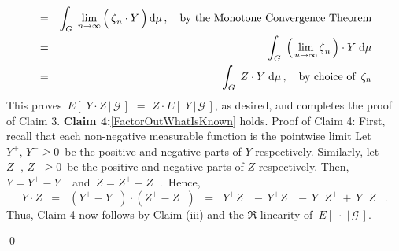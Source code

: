 \begin{enumerate}
\begin{eqnarray*}
	&=&
		\int_{G}\;
			\underset{n\rightarrow\infty}{\lim}\left(\,\overset{{\color{white}.}}{\zeta}_{n} \cdot Y\,\right)
			\d\mu
			\,,\quad\textnormal{by the Monotone Convergence Theorem}
	\\
	&=&
		\int_{G}\;
			\left(\,\underset{n\rightarrow\infty}{\lim}\,\overset{{\color{white}.}}{\zeta}_{n}\,\right) \cdot Y
			\;\d\mu
	\\
	&=&
		\int_{G}\; Z \cdot Y \;\d\mu
			\,,\quad\textnormal{by choice of \,$\zeta_{n}$}
	\end{eqnarray*}
	This proves \,$E\!\left[\;Y \cdot Z\,\vert\,\mathcal{G}\,\right]$ $=$ $Z \cdot E\!\left[\;Y\,\vert\,\mathcal{G}\,\right]$,
	as desired, and completes the proof of Claim 3.
	\vskip 0.4cm
	\textbf{Claim 4:}\;\;\eqref{FactorOutWhatIsKnown} holds.
	\vskip 0.0cm
	Proof of Claim 4: First, recall that each non-negative measurable function is the pointwise limit
	Let \,$Y^{+},\,Y^{-} \geq 0$\, be the positive and negative parts of $Y$ respectively.
	Similarly, let \,$Z^{+},\,Z^{-} \geq 0$\, be the positive and negative parts of $Z$ respectively.
	Then, \,$Y = Y^{+} - Y^{-}$\, and \,$Z = Z^{+} - Z^{-}$.\,
	Hence,
	\begin{equation*}
	Y \cdot Z
	\;\; = \;\; (Y^{+} - Y^{-}) \cdot (Z^{+} - Z^{-})
	\;\; = \;\; Y^{+}Z^{+} \,-\, Y^{+}Z^{-} \,-\, Y^{-}Z^{+} \,+\, Y^{-}Z^{-}\,.
	\end{equation*}
	Thus, Claim 4 now follows by Claim (iii) and the $\Re$-linearity of \,$E\!\left[\;\cdot\;\vert\,\mathcal{G}\,\right]$.
\end{enumerate}

\qed

